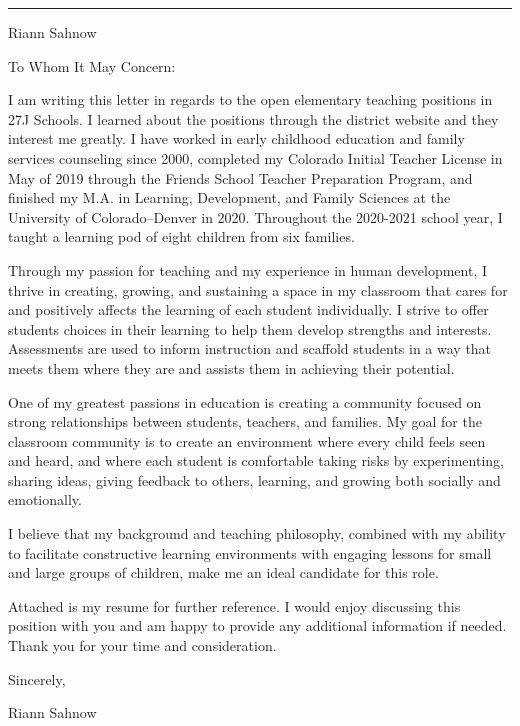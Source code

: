 \documentclass[letterpaper,10pt]{article}
\newcommand{\mblue}{\color{darkblue}}
\begin{document}
\pagestyle{empty}

{\mblue\rule{4.63in}{0.08cm}}

\vspace{-1.0pc}
\hfill{\Huge\mblue Riann Sahnow}

\vspace{2pc}
To Whom It May Concern:

\bigbreak\qquad I am writing this letter in regards to the open elementary
teaching positions in 27J Schools. I learned about the positions through
the district website and they interest me greatly. I have worked in early childhood
education and family services counseling since 2000, completed
my Colorado Initial Teacher License in May of 2019 through the Friends School Teacher Preparation
Program, and finished my M.A. in Learning, Development, and Family Sciences
at the University of Colorado--Denver in 2020. Throughout the 2020-2021 school year,
I taught a learning pod of eight children from six families.

\bigbreak\qquad Through my passion for teaching and my experience in
human development, I thrive in creating, growing, and sustaining a space in
my classroom that cares for and positively affects the learning of each student
individually. I strive to offer students choices in their learning to help them
develop strengths and interests. Assessments are used to inform instruction and
scaffold students in a way that meets them where they are and assists them in
achieving their potential.

\bigbreak\qquad One of my greatest passions in education is creating
a community focused on strong relationships between students, teachers, and
families. My goal for the classroom community is to create an environment
where every child feels seen and heard, and where each student is comfortable
taking risks by experimenting, sharing ideas, giving feedback to others, learning,
and growing both socially and emotionally.


\bigbreak\qquad I believe that my background and teaching philosophy, combined
with my ability to facilitate constructive learning environments with engaging
lessons for small and large groups of children, make me an ideal candidate for
this role.

\bigbreak\qquad Attached is my resume for further reference. I would enjoy
discussing this position with you and am happy to provide any additional
information if needed. Thank you for your time and consideration.

\bigbreak Sincerely,

\vspace{2pc} Riann Sahnow
\end{document}

